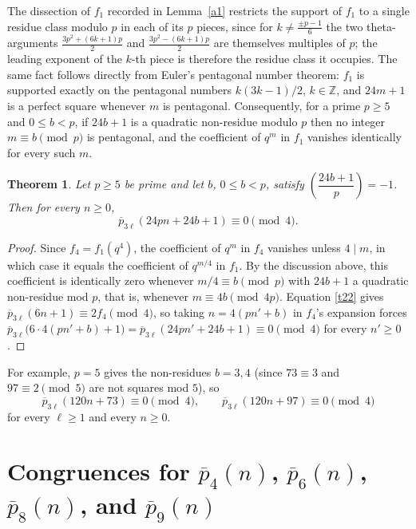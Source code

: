 \documentclass[11pt, reqno]{amsart}
\newtheorem{theorem}{Theorem}[section]
\numberwithin{equation}{section}
\begin{document}
	The dissection of $f_1$ recorded in Lemma~\ref{a1} restricts the support of $f_1$
	to a single residue class modulo $p$ in each of its $p$ pieces, since for
	$k\neq\frac{\pm p-1}{6}$ the two theta-arguments
	$\frac{3p^2+(6k+1)p}{2}$ and $\frac{3p^2-(6k+1)p}{2}$ are themselves multiples of
	$p$; the leading exponent of the $k$-th piece is therefore the residue class it
	occupies. The same fact follows directly from Euler's pentagonal number theorem:
	$f_1$ is supported exactly on the pentagonal numbers $k(3k-1)/2$, $k\in\mathbb Z$,
	and $24m+1$ is a perfect square whenever $m$ is pentagonal. Consequently, for a
	prime $p\ge5$ and $0\le b<p$, if $24b+1$ is a quadratic non-residue modulo $p$
	then no integer $m\equiv b\pmod p$ is pentagonal, and the coefficient of $q^m$ in
	$f_1$ vanishes identically for every such $m$.
	
	\begin{theorem}\label{thpdiss1}
		Let $p\ge5$ be prime and let $b$, $0\le b<p$, satisfy
		$\left(\dfrac{24b+1}{p}\right)=-1$. Then for every $n\ge0$,
		\begin{equation}
			\overline{p}_{3\ell}(24pn+24b+1)\equiv0\pmod4.
			\label{pdiss3l}
		\end{equation}
	\end{theorem}
	\begin{proof}
		Since $f_4=f_1(q^4)$, the coefficient of $q^m$ in $f_4$ vanishes unless $4\mid m$,
		in which case it equals the coefficient of $q^{m/4}$ in $f_1$. By the discussion
		above, this coefficient is identically zero whenever $m/4\equiv b\pmod p$ with
		$24b+1$ a quadratic non-residue mod $p$, that is, whenever
		$m\equiv4b\pmod{4p}$. Equation \eqref{t22} gives
		$\overline{p}_{3\ell}(6n+1)\equiv2f_4\pmod4$, so taking $n=4(pn'+b)$ in $f_4$'s
		expansion forces $\overline{p}_{3\ell}\bigl(6\cdot4(pn'+b)+1\bigr)
		=\overline{p}_{3\ell}(24pn'+24b+1)\equiv0\pmod4$ for every $n'\ge0$.
	\end{proof}
	For example, $p=5$ gives the non-residues $b=3,4$ (since $73\equiv3$ and
	$97\equiv2\pmod5$ are not squares mod $5$), so
	\[
	\overline{p}_{3\ell}(120n+73)\equiv0\pmod4,\qquad
	\overline{p}_{3\ell}(120n+97)\equiv0\pmod4
	\]
	for every $\ell\ge1$ and every $n\ge0$.
	
	\section{Congruences for $\overline{p}_4(n)$, $\overline{p}_6(n)$, $\overline{p}_8(n)$, and $\overline{p}_9(n)$}
\end{document}
